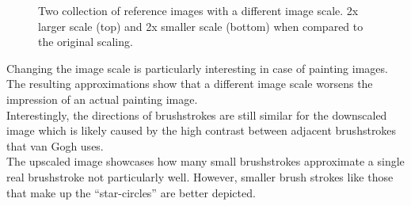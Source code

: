 \begin{figure}[!htb]
    \caption{Two collection of reference images with a different image scale. 2x larger scale (top) and 2x smaller scale (bottom) when compared to the original scaling.}
\end{figure}
Changing the image scale is particularly interesting in case of painting images.
The resulting approximations show that a different image scale worsens the impression of an actual painting image.\\
Interestingly, the directions of brushstrokes are still similar for the downscaled image which is likely caused by the high contrast between adjacent brushstrokes that van Gogh uses.\\
The upscaled image showcases how many small brushstrokes approximate a single real brushstroke not particularly well.
However, smaller brush strokes like those that make up the ``star-circles'' are better depicted.

